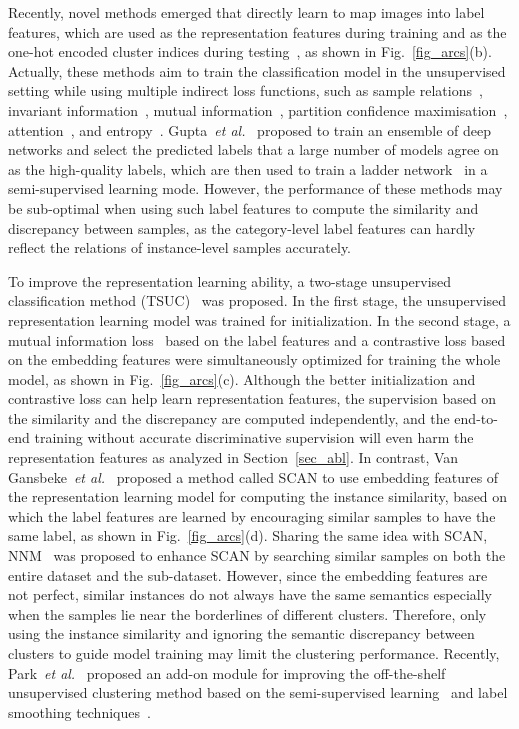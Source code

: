 \documentclass[journal]{IEEEtran}
\newcommand{\etal}{\emph{et al.}\xspace}
\begin{document}
Recently, novel methods emerged that directly learn to map images into label features, which are used as the representation features during training and as the one-hot encoded cluster indices during testing~\cite{pami-c2, DAIC2017, dsec, Wu_2019_ICCV, IIC2019, Huang_2020_CVPR, gatcluster, scan, cc, pami-c1, idfd}, as shown in Fig.~\ref{fig_arcs}(b). Actually, these methods aim to train the classification model in the unsupervised setting while using multiple indirect loss functions, such as sample relations~\cite{DAIC2017}, invariant information~\cite{IIC2019, cc}, mutual information~\cite{Wu_2019_ICCV}, partition confidence maximisation~\cite{Huang_2020_CVPR}, attention~\cite{gatcluster}, and entropy~\cite{gatcluster, Huang_2020_CVPR, scan, cc}. 
Gupta~\etal~\cite{Gupta2020Unsupervised} proposed to train an ensemble of deep networks and select the predicted labels that a large number of models agree on as the high-quality labels, which are then used to train a ladder network~\cite{ladder} in a semi-supervised learning mode.
However, the performance of these methods may be sub-optimal when using such label features to compute the similarity and discrepancy between samples, as the category-level label features can hardly reflect the relations of instance-level samples accurately.

To improve the representation learning ability, a two-stage unsupervised classification method (TSUC)~\cite{tsuc} was proposed. In the first stage, the unsupervised representation learning model was trained for initialization. In the second stage, a mutual information loss~\cite{Wu_2019_ICCV} based on the label features and a contrastive loss based on the embedding features were simultaneously optimized for training the whole model, as shown in Fig.~\ref{fig_arcs}(c).
Although the better initialization and contrastive loss can help learn representation features, the supervision based on the similarity and the discrepancy are computed independently, and the end-to-end training without accurate discriminative supervision will even harm the representation features as analyzed in Section~\ref{sec_abl}.
In contrast, Van Gansbeke~\etal~\cite{scan} proposed a method called SCAN to use embedding features of the representation learning model for computing the instance similarity, based on which the label features are learned by encouraging similar samples to have the same label, as shown in Fig.~\ref{fig_arcs}(d).
Sharing the same idea with SCAN, NNM~\cite{Dang_2021_CVPR} was proposed to enhance SCAN by searching similar samples on both the entire dataset and the sub-dataset.
However, since the embedding features are not perfect, similar instances do not always have the same semantics especially when the samples lie near the borderlines of different clusters. Therefore, only using the instance similarity and ignoring the semantic discrepancy between clusters to guide model training may limit the clustering performance.
Recently, Park~\etal~\cite{Park_2021_CVPR} proposed an add-on module for improving the off-the-shelf unsupervised clustering method based on the semi-supervised learning~\cite{mixmatch} and label smoothing techniques~\cite{Li2020DivideMix, pmlr-v119-lukasik20a}.
\end{document}
